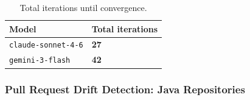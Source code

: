 \documentclass[sigconf,screen]{acmart}
\begin{document}
\begin{table}[t]
    \centering
    \small
    \caption{Total iterations until convergence.}
    \label{tab:convergence-total}
    \begin{tabular}{@{}p{}C{0.35\columnwidth}@{}}
        \toprule
        \textbf{Model} & \textbf{Total iterations} \\
        \midrule
        \texttt{claude-sonnet-4-6} & \textbf{27} \\
        \texttt{gemini-3-flash} & \textbf{42} \\
        \bottomrule
    \end{tabular}
\end{table}

\subsubsection{Pull Request Drift Detection: Java Repositories}
\end{document}
